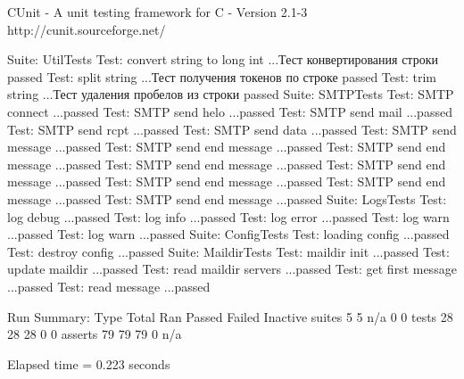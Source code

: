 

     CUnit - A unit testing framework for C - Version 2.1-3
     http://cunit.sourceforge.net/


Suite: UtilTests
  Test: convert string to long int ...Тест конвертирования строки
passed
  Test: split string ...Тест получения токенов по строке
passed
  Test: trim string ...Тест удаления пробелов из строки
passed
Suite: SMTPTests
  Test: SMTP connect ...passed
  Test: SMTP send helo ...passed
  Test: SMTP send mail ...passed
  Test: SMTP send rcpt ...passed
  Test: SMTP send data ...passed
  Test: SMTP send message ...passed
  Test: SMTP send end message ...passed
  Test: SMTP send end message ...passed
  Test: SMTP send end message ...passed
  Test: SMTP send end message ...passed
  Test: SMTP send end message ...passed
  Test: SMTP send end message ...passed
  Test: SMTP send end message ...passed
Suite: LogsTests
  Test: log debug ...passed
  Test: log info ...passed
  Test: log error ...passed
  Test: log warn ...passed
  Test: log warn ...passed
Suite: ConfigTests
  Test: loading config ...passed
  Test: destroy config ...passed
Suite: MaildirTests
  Test: maildir init ...passed
  Test: update maildir ...passed
  Test: read maildir servers ...passed
  Test: get first message ...passed
  Test: read message ...passed

Run Summary:    Type  Total    Ran Passed Failed Inactive
              suites      5      5    n/a      0        0
               tests     28     28     28      0        0
             asserts     79     79     79      0      n/a

Elapsed time =    0.223 seconds
